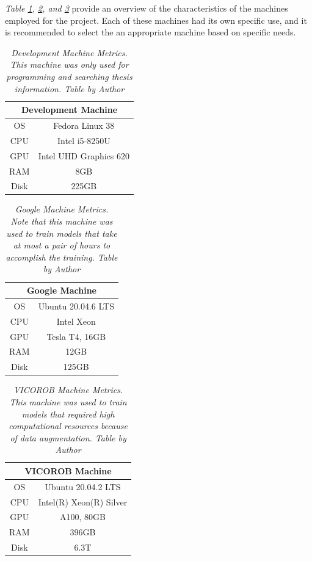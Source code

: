 \textit{Table \ref{table:dev-machine}, \ref{table:google-machine}, and \ref{table:vicorobot-machine}} provide an overview of the characteristics of the machines employed for the project. Each of these machines had its own specific use, and it is recommended to select the an appropriate machine based on specific needs.

\begin{table}[H]
  \centering
  \begin{tabular}{cc}
    \toprule
    \multicolumn{2}{c}{\textbf{Development Machine}} \\
    \midrule
    OS & Fedora Linux 38 \\
    CPU & Intel i5-8250U \\
    GPU & Intel UHD Graphics 620 \\
    RAM & 8GB \\
    Disk & 225GB \\
    \bottomrule
  \end{tabular}
  \caption[Development Machine Metrics.]
  {\textit{Development Machine Metrics.
  This machine was only used for programming and searching thesis information.
  Table by Author}}
  \label{table:dev-machine}
\end{table}


\begin{table}[H]
  \centering
  \begin{tabular}{cc}
    \toprule
    \multicolumn{2}{c}{\textbf{Google Machine}} \\
    \midrule
    OS & Ubuntu 20.04.6 LTS \\
    CPU & Intel Xeon \\
    GPU & Tesla T4, 16GB \\
    RAM & 12GB \\
    Disk & 125GB \\
    \bottomrule
  \end{tabular}
  \caption[Google Machine Metrics.]
  {\textit{Google Machine Metrics.
  Note that this machine was used to train models that take at most a pair of hours to accomplish the training.
  Table by Author}}
  {\label{table:google-machine}}
\end{table}

\newpage

\begin{table}[H]
  \centering
  \begin{tabular}{cc}
    \toprule
    \multicolumn{2}{c}{\textbf{VICOROB Machine}} \\
    \midrule
    OS & Ubuntu 20.04.2 LTS \\
    CPU & Intel(R) Xeon(R) Silver \\
    GPU & A100, 80GB\\
    RAM & 396GB \\
    Disk & 6.3T \\
    \bottomrule
  \end{tabular}
  \caption[VICOROB Machine Metrics.]
  {\textit{VICOROB Machine Metrics.
  This machine was used to train models that required high computational resources because of data augmentation.
  Table by Author}}
  {\label{table:vicorobot-machine}}
\end{table}

